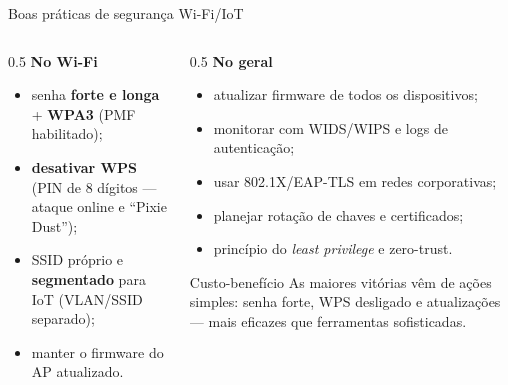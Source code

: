 \documentclass[aspectratio=169,11pt]{beamer}
\begin{document}
\begin{frame}{Boas práticas de segurança Wi-Fi/IoT}
  \begin{columns}
    \begin{column}{0.5\textwidth}
      \textbf{No Wi-Fi}
      \begin{itemize}
        \item senha \textbf{forte e longa} + \textbf{WPA3} (PMF habilitado);
        \item \textbf{desativar WPS} (PIN de 8 dígitos --- ataque online e ``Pixie Dust'');
        \item SSID próprio e \textbf{segmentado} para IoT (VLAN/SSID separado);
        \item manter o firmware do AP atualizado.
      \end{itemize}
    \end{column}
    \begin{column}{0.5\textwidth}
      \textbf{No geral}
      \begin{itemize}
        \item atualizar firmware de todos os dispositivos;
        \item monitorar com WIDS/WIPS e logs de autenticação;
        \item usar 802.1X/EAP-TLS em redes corporativas;
        \item planejar rotação de chaves e certificados;
        \item princípio do \emph{least privilege} e zero-trust.
      \end{itemize}
      \begin{exampleblock}{Custo-benefício}
        As maiores vitórias vêm de ações simples: senha forte, WPS desligado e atualizações --- mais eficazes que ferramentas sofisticadas.
      \end{exampleblock}
    \end{column}
  \end{columns}
\end{frame}
\end{document}
